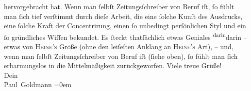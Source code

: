 \begin{ledgroupsized}[t]{13cm}
               hervorgebracht hat. Wenn man ſelbſt Zeitungsſchreiber von Beruf iſt, ſo fühlt man
               ſich tief verſtimmt durch  dieſe Arbeit, die eine ſolche Kunſt
               des Ausdrucks, eine ſolche Kraft der Concentrirung, einen ſo unbedingt perſönlichen
               Styl und ein ſo gründliches Wiſſen bekundet. Es ſteckt thatſächlich etwas Geniales \substVorne{}\textsuperscript{darin}\substDazwischen{}darin\substHinten{} – {\pb}etwas von \textsc{Heine’s} Größe (ohne den leiſeſten
               Anklang an \textsc{Heine’s} Art), – und, wenn man ſelbſt
               Zeitungsſchreiber von Beruf iſt (ſiehe oben), ſo fühlt man ſich erbarmungslos in die
               Mittelmäßigkeit zurückgeworfen.\pend
           \pstart
           Viele treue Grüße! {\\[\baselineskip]}Dein {\\[\baselineskip]}\spacefill\mbox{Paul Goldmann}\pend
           \leftskip=0em{}
         
         \endnumbering{}\end{ledgroupsized}  \newcommand{\dateiname}{L02899}\newcommand{\titel}{Paul Goldmann an Arthur Schnitzler, 13. 12. [1899]}\newcommand{\editorInnen}{Martin Anton Müller und Laura Untner}
      